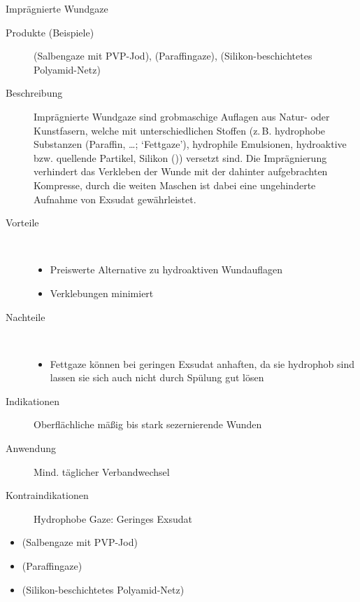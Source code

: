 \TextSlide
{Imprägnierte Wundgaze}
{
\begin{description}
  \item[Produkte (Beispiele)] 
  (Salbengaze mit PVP-Jod), 
  (Paraffingaze), 
  (Silikon-beschichtetes Polyamid-Netz)
  \item[Beschreibung] Imprägnierte Wundgaze sind
  grobmaschige Auflagen aus Natur- oder Kunstfasern, welche mit unterschiedlichen Stoffen 
(z.\,B. hydrophobe Substanzen (Paraffin, \ldots;
\enquote*{Fettgaze}), hydrophile Emulsionen, hydroaktive
bzw.
quellende Partikel, Silikon ())
versetzt sind.
Die Imprägnierung verhindert das Verkleben der Wunde mit der dahinter
aufgebrachten Kompresse, durch die weiten Maschen ist dabei
eine ungehinderte Aufnahme von Exsudat gewährleistet.
  \item[Vorteile] ~
  \begin{itemize}
    \item[$+$] Preiswerte Alternative zu hydroaktiven
    Wundauflagen
    \item[$+$] Verklebungen minimiert
  \end{itemize}
  \item[Nachteile] ~
  \begin{itemize}
    \item[$-$] Fettgaze können bei geringen Exsudat
    anhaften, da sie hydrophob sind lassen sie sich auch
    nicht durch Spülung gut lösen
  \end{itemize}
  \item[Indikationen] Oberflächliche mäßig bis stark
  sezernierende Wunden
  \item[Anwendung] Mind. täglicher Verbandwechsel
  \item[Kontraindikationen] Hydrophobe Gaze: Geringes Exsudat
\end{description}
}
{
\begin{itemize}
  \item {}
  (Salbengaze mit PVP-Jod)
  \item {}
  (Paraffingaze)
  \item {}
  (Silikon-beschichtetes Polyamid-Netz)
\end{itemize}
}
{}
{}
{}

